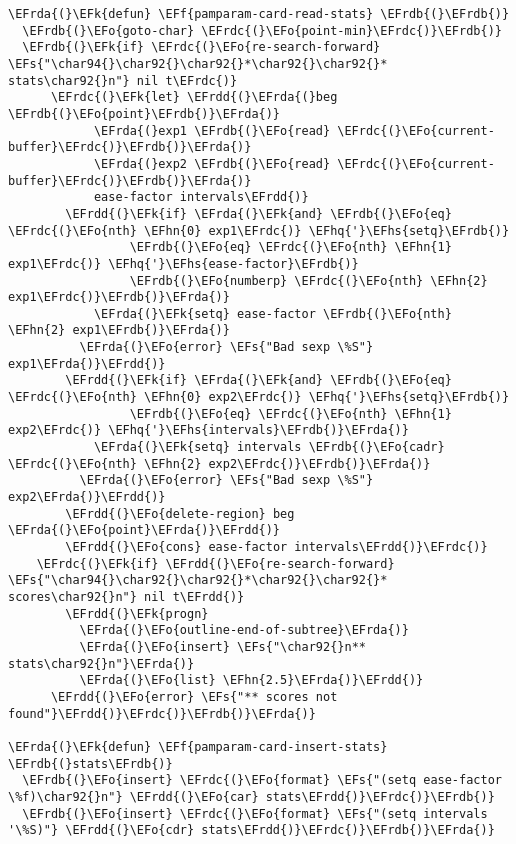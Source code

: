 \documentclass[a4wide,10pt]{article}
\newcommand{\EFs}[1]{\textcolor{EFs}{#1}} %
\newcommand{\EFk}[1]{\textcolor{EFk}{#1}} %
\newcommand{\EFf}[1]{\textcolor{EFf}{#1}} %
\newcommand{\EFo}[1]{\textcolor{EFo}{#1}} %
\newcommand{\EFhn}[1]{\textcolor{EFhn}{\textbf{#1}}} %
\newcommand{\EFhq}[1]{\textcolor{EFhq}{#1}} %
\newcommand{\EFhs}[1]{\textcolor{EFhs}{#1}} %
\newcommand{\EFrda}[1]{\textcolor{EFrda}{#1}} %
\newcommand{\EFrdb}[1]{\textcolor{EFrdb}{#1}} %
\newcommand{\EFrdc}[1]{\textcolor{EFrdc}{#1}} %
\newcommand{\EFrdd}[1]{\textcolor{EFrdd}{#1}} %
\begin{document}
\begin{Code}
\begin{Verbatim}
\EFrda{(}\EFk{defun} \EFf{pamparam-card-read-stats} \EFrdb{(}\EFrdb{)}
  \EFrdb{(}\EFo{goto-char} \EFrdc{(}\EFo{point-min}\EFrdc{)}\EFrdb{)}
  \EFrdb{(}\EFk{if} \EFrdc{(}\EFo{re-search-forward} \EFs{"\char94{}\char92{}\char92{}*\char92{}\char92{}* stats\char92{}n"} nil t\EFrdc{)}
      \EFrdc{(}\EFk{let} \EFrdd{(}\EFrda{(}beg \EFrdb{(}\EFo{point}\EFrdb{)}\EFrda{)}
            \EFrda{(}exp1 \EFrdb{(}\EFo{read} \EFrdc{(}\EFo{current-buffer}\EFrdc{)}\EFrdb{)}\EFrda{)}
            \EFrda{(}exp2 \EFrdb{(}\EFo{read} \EFrdc{(}\EFo{current-buffer}\EFrdc{)}\EFrdb{)}\EFrda{)}
            ease-factor intervals\EFrdd{)}
        \EFrdd{(}\EFk{if} \EFrda{(}\EFk{and} \EFrdb{(}\EFo{eq} \EFrdc{(}\EFo{nth} \EFhn{0} exp1\EFrdc{)} \EFhq{'}\EFhs{setq}\EFrdb{)}
                 \EFrdb{(}\EFo{eq} \EFrdc{(}\EFo{nth} \EFhn{1} exp1\EFrdc{)} \EFhq{'}\EFhs{ease-factor}\EFrdb{)}
                 \EFrdb{(}\EFo{numberp} \EFrdc{(}\EFo{nth} \EFhn{2} exp1\EFrdc{)}\EFrdb{)}\EFrda{)}
            \EFrda{(}\EFk{setq} ease-factor \EFrdb{(}\EFo{nth} \EFhn{2} exp1\EFrdb{)}\EFrda{)}
          \EFrda{(}\EFo{error} \EFs{"Bad sexp \%S"} exp1\EFrda{)}\EFrdd{)}
        \EFrdd{(}\EFk{if} \EFrda{(}\EFk{and} \EFrdb{(}\EFo{eq} \EFrdc{(}\EFo{nth} \EFhn{0} exp2\EFrdc{)} \EFhq{'}\EFhs{setq}\EFrdb{)}
                 \EFrdb{(}\EFo{eq} \EFrdc{(}\EFo{nth} \EFhn{1} exp2\EFrdc{)} \EFhq{'}\EFhs{intervals}\EFrdb{)}\EFrda{)}
            \EFrda{(}\EFk{setq} intervals \EFrdb{(}\EFo{cadr} \EFrdc{(}\EFo{nth} \EFhn{2} exp2\EFrdc{)}\EFrdb{)}\EFrda{)}
          \EFrda{(}\EFo{error} \EFs{"Bad sexp \%S"} exp2\EFrda{)}\EFrdd{)}
        \EFrdd{(}\EFo{delete-region} beg \EFrda{(}\EFo{point}\EFrda{)}\EFrdd{)}
        \EFrdd{(}\EFo{cons} ease-factor intervals\EFrdd{)}\EFrdc{)}
    \EFrdc{(}\EFk{if} \EFrdd{(}\EFo{re-search-forward} \EFs{"\char94{}\char92{}\char92{}*\char92{}\char92{}* scores\char92{}n"} nil t\EFrdd{)}
        \EFrdd{(}\EFk{progn}
          \EFrda{(}\EFo{outline-end-of-subtree}\EFrda{)}
          \EFrda{(}\EFo{insert} \EFs{"\char92{}n** stats\char92{}n"}\EFrda{)}
          \EFrda{(}\EFo{list} \EFhn{2.5}\EFrda{)}\EFrdd{)}
      \EFrdd{(}\EFo{error} \EFs{"** scores not found"}\EFrdd{)}\EFrdc{)}\EFrdb{)}\EFrda{)}

\EFrda{(}\EFk{defun} \EFf{pamparam-card-insert-stats} \EFrdb{(}stats\EFrdb{)}
  \EFrdb{(}\EFo{insert} \EFrdc{(}\EFo{format} \EFs{"(setq ease-factor \%f)\char92{}n"} \EFrdd{(}\EFo{car} stats\EFrdd{)}\EFrdc{)}\EFrdb{)}
  \EFrdb{(}\EFo{insert} \EFrdc{(}\EFo{format} \EFs{"(setq intervals '\%S)"} \EFrdd{(}\EFo{cdr} stats\EFrdd{)}\EFrdc{)}\EFrdb{)}\EFrda{)}


\end{Verbatim}
\end{Code}
\end{document}
